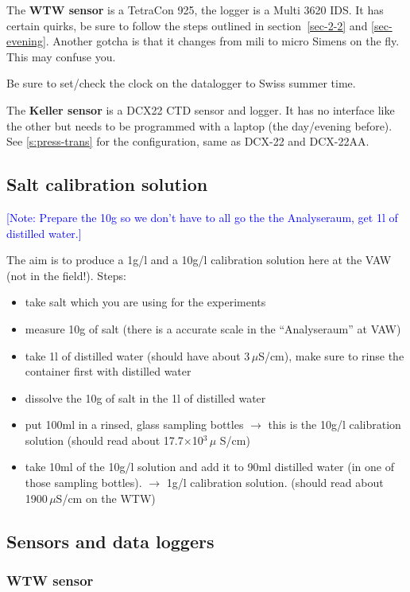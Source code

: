 \documentclass[DIV=15,halfparskip,11pt,headinclude]{scrartcl}
\newcommand{\note}[1]{\textcolor{blue}{[Note: #1]}}
\newcommand{\note}[1]{}
\begin{document}
The \textbf{WTW sensor} is a TetraCon 925, the logger is a Multi 3620 IDS.  It
has certain quirks, be sure to follow the steps outlined in
section~\ref{sec-2-2} and \ref{sec-evening}.  Another gotcha is that
it changes from mili to micro Simens on the fly.  This may confuse
you.

Be sure to set/check the clock on the datalogger to Swiss summer time.

The \textbf{Keller sensor} is a DCX22 CTD sensor and logger.  It has
no interface like the other but needs to be programmed with a laptop
(the day/evening before).  See \ref{s:press-trans} for the
configuration, same as DCX-22 and DCX-22AA.

\subsection{Salt calibration solution}
\note{Prepare the 10g so we don't have to all go the the Analyseraum,
  get 1l of distilled water.}

The aim is to produce a 1g/l and a 10g/l calibration solution here at the VAW
(not in the field!).  Steps:
\begin{itemize}
\item take salt which you are using for the experiments
\item measure 10g of salt (there is a accurate scale in the
  ``Analyseraum'' at VAW)
\item take 1l of distilled water (should have about 3\,$\mu$S/cm),
  make sure to rinse the container first with distilled water
\item dissolve the 10g of salt in the 1l of distilled water
\item put 100ml in a rinsed, glass sampling bottles $\rightarrow$ this
  is the 10g/l calibration solution (should read about 17.7$\times$10$^3\,\mu$
  S/cm)
\item take 10ml of the 10g/l solution and add it to 90ml distilled
  water (in one of those sampling bottles).  $\rightarrow$ 1g/l
  calibration solution. (should read about 1900\,$\mu$S/cm on the WTW)
\end{itemize}

\subsection{Sensors and data loggers}
\subsubsection{WTW sensor}
\end{document}
